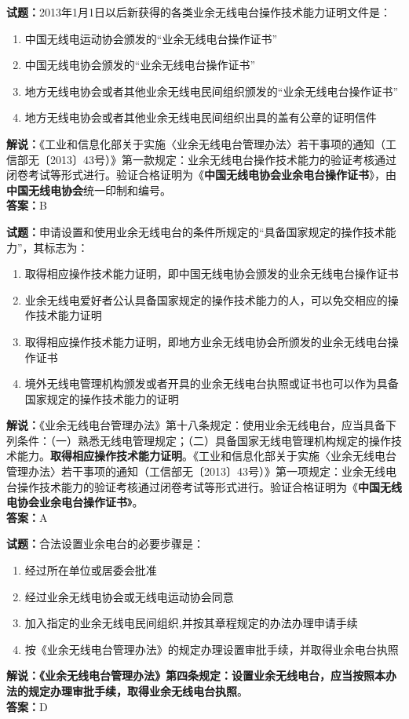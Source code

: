 \documentclass{ctexbook}
\begin{document}
\noindent\textbf{试题：}2013年1月1日以后新获得的各类业余无线电台操作技术能力证明文件是：
\begin{enumerate}[leftmargin=3em]
	\item 中国无线电运动协会颁发的“业余无线电台操作证书”
	\item 中国无线电协会颁发的“业余无线电台操作证书”
	\item 地方无线电协会或者其他业余无线电民间组织颁发的“业余无线电台操作证书”
	\item 地方无线电协会或者其他业余无线电民间组织出具的盖有公章的证明信件
\end{enumerate}
\noindent\textbf{解说：}《工业和信息化部关于实施〈业余无线电台管理办法〉若干事项的通知（工信部无〔2013〕43号）》第一款规定：业余无线电台操作技术能力的验证考核通过闭卷考试等形式进行。验证合格证明为《\textbf{中国无线电协会业余电台操作证书}》，由\textbf{中国无线电协会}统一印制和编号。\\\noindent\textbf{答案：}B



\bigskip


\noindent\textbf{试题：}申请设置和使用业余无线电台的条件所规定的“具备国家规定的操作技术能力”，其标志为：
\begin{enumerate}[leftmargin=3em]
	\item 取得相应操作技术能力证明，即中国无线电协会颁发的业余无线电台操作证书
	\item 业余无线电爱好者公认具备国家规定的操作技术能力的人，可以免交相应的操作技术能力证明
	\item 取得相应操作技术能力证明，即地方业余无线电协会所颁发的业余无线电台操作证书
	\item 境外无线电管理机构颁发或者开具的业余无线电台执照或证书也可以作为具备国家规定的操作技术能力的证明
\end{enumerate}
\noindent\textbf{解说：}《业余无线电台管理办法》第十八条规定：使用业余无线电台，应当具备下列条件：（一）熟悉无线电管理规定；（二）具备国家无线电管理机构规定的操作技术能力。\textbf{取得相应操作技术能力证明}。《工业和信息化部关于实施〈业余无线电台管理办法〉若干事项的通知（工信部无〔2013〕43号）》第一项规定：业余无线电台操作技术能力的验证考核通过闭卷考试等形式进行。验证合格证明为《\textbf{中国无线电协会业余电台操作证书}》。\\\noindent\textbf{答案：}A


\bigskip


\noindent\textbf{试题：}合法设置业余电台的必要步骤是：
\begin{enumerate}[leftmargin=3em]	
	\item 经过所在单位或居委会批准
	\item 经过业余无线电协会或无线电运动协会同意
	\item 加入指定的业余无线电民间组织,并按其章程规定的办法办理申请手续
	\item 按《业余无线电台管理办法》的规定办理设置审批手续，并取得业余电台执照
\end{enumerate}
\noindent\textbf{解说：}\textbf{《业余无线电台管理办法》第四条规定：设置业余无线电台，应当按照本办法的规定办理审批手续，取得业余无线电台执照}。\\\noindent\textbf{答案：}D
\end{document}
